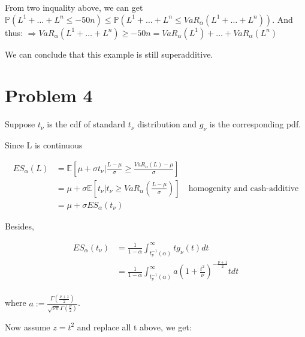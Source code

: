 \documentclass[letterpaper,11pt]{article}
\begin{document}
\begin{spacing}{1.2}
From two inquality above, we can get $\mathbb{P}(L^1+\ldots+L^n \le -50n) \le \mathbb{P}(L^1+\ldots+L^n \le VaR_{\alpha}(L^1+\ldots+L^n))$. And thus: $\Rightarrow VaR_{\alpha}(L^1+\ldots+L^n) \ge -50n = VaR_{\alpha}(L^1)+\ldots+VaR_{\alpha}(L^n)$

We can conclude that this example is still superadditive.

\section*{Problem 4}
Suppose $t_{\nu}$ is the cdf of standard $t_{\nu}$ distribution and $g_{\nu}$ is the corresponding pdf.

Since L is continuous

\begin{equation}
\begin{aligned}
ES_{\alpha}(L) &=\mathbb{E}[\mu+\sigma t_{\nu} | \frac{L-\mu}{\sigma} \ge \frac{VaR_{\alpha}(L) - \mu}{\sigma}] \\
&= \mu + \sigma \mathbb{E}[t_{\nu} | t_{\nu} \ge VaR_{\alpha} (\frac{L-\mu}{\sigma})] \quad \text{homogenity and cash-additive} \\
&= \mu + \sigma ES_{\alpha}(t_{\nu})
\end{aligned}
\end{equation}

Besides,

\begin{equation}
\begin{aligned}
ES_{\alpha}(t_{\nu}) &= \frac{1}{1-\alpha} \int_{t_{\nu}^{-1}(\alpha)}^{\infty} tg_{\nu}(t) dt \\
&= \frac{1}{1-\alpha} \int_{t_{\nu}^{-1}(\alpha)}^{\infty} a(1+\frac{t^2}{\nu})^{-\frac{\nu+1}{2}}t dt \\
\end{aligned}
\end{equation}

where $a:= \frac{\Gamma(\frac{\nu + 1}{2})}{\sqrt{\nu \pi} \Gamma(\frac{\nu}{2})}$.

Now assume $z = t^2$ and replace all t above, we get:


\end{spacing}
\end{document}
